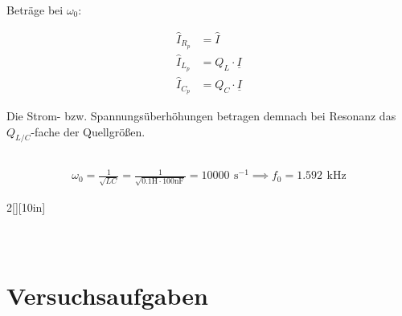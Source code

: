 \documentclass[a4paper, 12pt]{article}
\begin{document}
    Beträge bei $\omega_0$:

    \begin{align*}
      \hat{I}_{R_p} &= \hat{I}\\
      \hat{I}_{L_p} &= Q_L \cdot \underline{I}\\
      \hat{I}_{C_p} &= Q_C \cdot \underline{I}
    \end{align*}

    Die Strom- bzw. Spannungsüberhöhungen betragen demnach bei Resonanz das $Q_{L/C}$-fache der Quellgrößen.

  \subsection{}
  \begin{gather*}
    \omega_0 = \frac{1}{\sqrt{LC}} = \frac{1}{\sqrt{0.1 \si{\henry} \cdot 100 \si{\nano\farad}}} = 10000 \,\ \si{\second}^{-1} \implies f_0 = 1.592 \,\ \si{\kilo\hertz}
  \end{gather*}

  \begin{multicols}{2}[][10in]

    \begin{gather*}
    \end{gather*}

    \begin{gather*}
    \end{gather*}

  \end{multicols}



  \subsection{}

\section{Versuchsaufgaben}
\end{document}
